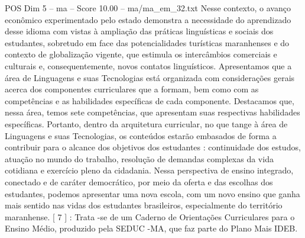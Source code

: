 \begin{textsample}{POS Dim 5 – ma – Score 10.00 – ma/ma\_em\_32.txt}
Nesse contexto, o avanço econômico experimentado pelo estado demonstra a necessidade do aprendizado desse idioma com vistas à ampliação das práticas linguísticas e sociais dos estudantes, sobretudo em face das potencialidades turísticas maranhenses e do contexto de globalização vigente, que estimula os intercâmbios comerciais e culturais e, consequentemente, novos contatos linguísticos.
Apresentamos que a área de Linguagens e suas Tecnologias está organizada com considerações gerais acerca dos componentes curriculares que a formam, bem como com as competências e as habilidades específicas de cada componente.
Destacamos que, nessa área, temos sete competências, que apresentam suas respectivas habilidades específicas.
Portanto, dentro da arquitetura curricular, no que tange à área de Linguagens e suas Tecnologias, os conteúdos estarão embasados de forma a contribuir para o alcance dos objetivos dos estudantes : continuidade dos estudos, atuação no mundo do trabalho, resolução de demandas complexas da vida cotidiana e exercício pleno da cidadania.
Nessa perspectiva de ensino integrado, conectado e de caráter democrático, por meio da oferta e das escolhas dos estudantes, podemos apresentar uma nova escola, com um novo ensino que ganha mais sentido nas vidas dos estudantes brasileiros, especialmente do território maranhense. [ 7 ] : Trata -se de um Caderno de Orientações Curriculares para o Ensino Médio, produzido pela SEDUC -MA, que faz parte do Plano Mais IDEB.

\end{textsample}

